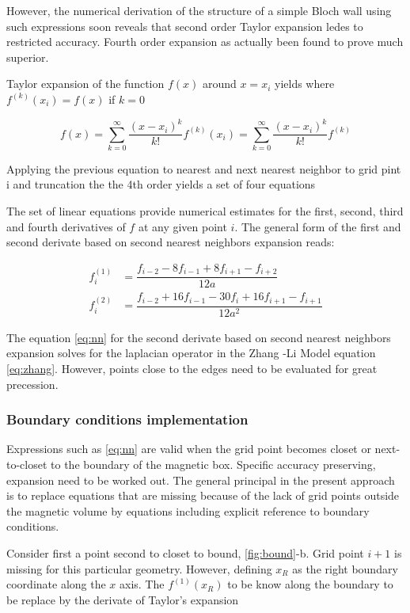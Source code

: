 However, the numerical derivation of the structure of a simple Bloch wall using such expressions soon reveals that second order Taylor expansion ledes to restricted accuracy. Fourth order expansion as actually been found to prove much superior.  \cite{methods}

Taylor expansion of the function $f(x)$ around $x=x_i$ yields where $f^{(k)}(x_i) = f(x)$ if $k=0$

$$f(x) = \sum\limits_{k=0}^{\infty} \dfrac{(x-x_i)^k}{k!}f^{(k)}(x_i) = \sum\limits_{k=0}^{\infty} \dfrac{(x-x_i)^k}{k!}f^{(k)}$$

Applying the previous equation to nearest and next nearest neighbor to grid pint i and truncation the the 4th order yields a set of four equations

The set of linear equations provide numerical estimates for the first, second, third and fourth derivatives of $f$ at any given point $i$. The general form of the first and second derivate based on second nearest neighbors expansion reads:

\begin{align} \label{eq:nn}
f^{(1)}_i &= \dfrac{f_{i-2}-8f_{i-1} + 8f_{i+1} - f_{i+2}}{12a} \\
f^{(2)}_i &= \dfrac{f_{i-2}+16f_{i-1} -30f_{i} + 16f_{i+1} - f_{i+1}}{12a^2}
\end{align}

The equation \ref{eq:nn} for the second derivate based on second nearest neighbors expansion solves for the laplacian operator in the Zhang -Li Model equation \ref{eq:zhang}. However, points close to the edges need to be evaluated for great precession. 

\subsubsection{Boundary conditions implementation}

Expressions such as \ref{eq:nn} are valid when the grid point becomes closet or next-to-closet to the boundary of the magnetic box. Specific accuracy preserving, expansion need to be worked out. The general principal in the present approach is to replace equations that are missing because of the lack of grid points outside the magnetic volume by equations including explicit reference to boundary conditions. \cite{methods}

Consider first a point second to closet to bound, \ref{fig:bound}-b. Grid point $i + 1$ is missing for this particular geometry. However, defining $x_R$ as the right boundary coordinate along the $x$ axis. The $f^{(1)}(x_R)$ to be know along the boundary to be replace by the derivate of Taylor's expansion

